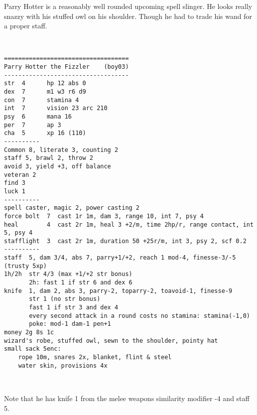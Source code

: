 \clearpage
\begin{samepage}

\noindent Parry Hotter is a reasonably well rounded upcoming spell slinger. He looks really snazzy with his stuffed owl on his shoulder. Though he had to trade his wand for a proper staff.

\

\small \begin{verbatim}
===================================
Parry Hotter the Fizzler    (boy03)
-----------------------------------
str  4      hp 12 abs 0
dex  7      m1 w3 r6 d9
con  7      stamina 4
int  7      vision 23 arc 210
psy  6      mana 16
per  7      ap 3
cha  5      xp 16 (110)
----------
Common 8, literate 3, counting 2
staff 5, brawl 2, throw 2
avoid 3, yield +3, off balance
veteran 2
find 3
luck 1
----------
spell caster, magic 2, power casting 2
force bolt  7  cast 1r 1m, dam 3, range 10, int 7, psy 4
heal        4  cast 2r 1m, heal 3 +2/m, time 2hp/r, range contact, int 5, psy 4
stafflight  3  cast 2r 1m, duration 50 +25r/m, int 3, psy 2, scf 0.2
----------
staff  5, dam 3/4, abs 7, parry+1/+2, reach 1 mod-4, finesse-3/-5   (trusty 5xp)
1h/2h  str 4/3 (max +1/+2 str bonus)
       2h: fast 1 if str 6 and dex 6
knife  1, dam 2, abs 3, parry-2, toparry-2, toavoid-1, finesse-9
       str 1 (no str bonus)
       fast 1 if str 3 and dex 4
       every second attack in a round costs no stamina: stamina(-1,0)
       poke: mod-1 dam-1 pen+1
money 2g 8s 1c
wizard's robe, stuffed owl, sewn to the shoulder, pointy hat
small sack 5enc:
    rope 10m, snares 2x, blanket, flint & steel
    water skin, provisions 4x
\end{verbatim} \end{samepage} \normalsize

\

\noindent Note that he has knife 1 from the melee weapons similarity modifier -4 and staff 5.






